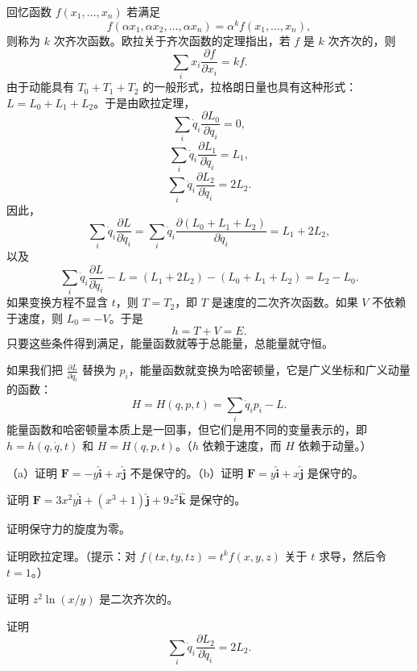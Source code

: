 回忆函数 $f(x_1, \ldots, x_n)$ 若满足
$$
f(\alpha x_1, \alpha x_2, \ldots, \alpha x_n) = \alpha^k f(x_1, \ldots, x_n),
$$
则称为 $k$ 次齐次函数。欧拉关于齐次函数的定理指出，若 $f$ 是 $k$ 次齐次的，则
$$
\sum_i x_i\frac{\partial f}{\partial x_i} = kf.
$$
由于动能具有 $T_0 + T_1 + T_2$ 的一般形式，拉格朗日量也具有这种形式：$L = L_0 + L_1 + L_2$。于是由欧拉定理，
$$
\sum_i\dot{q}_i\frac{\partial L_0}{\partial \dot{q}_i} = 0,
$$
$$
\sum_i\dot{q}_i\frac{\partial L_1}{\partial \dot{q}_i} = L_1,
$$
$$
\sum_i\dot{q}_i\frac{\partial L_2}{\partial \dot{q}_i} = 2L_2.
$$
因此，
$$
\sum_i\dot{q}_i\frac{\partial L}{\partial \dot{q}_i} = \sum_i\dot{q}_i\frac{\partial (L_0 + L_1 + L_2)}{\partial \dot{q}_i} = L_1 + 2L_2,
$$
以及
$$
\sum_i\dot{q}_i\frac{\partial L}{\partial \dot{q}_i} - L = (L_1 + 2L_2) - (L_0 + L_1 + L_2) = L_2 - L_0.
$$
如果变换方程不显含 $t$，则 $T = T_2$，即 $T$ 是速度的二次齐次函数。如果 $V$ 不依赖于速度，则 $L_0 = -V$。于是
$$
h = T + V = E.
$$
只要这些条件得到满足，能量函数就等于总能量，总能量就守恒。

如果我们把 $\frac{\partial L}{\partial \dot{q}_i}$ 替换为 $p_i$，能量函数就变换为哈密顿量，它是广义坐标和广义动量的函数：
$$
H = H(q, p, t) = \sum_i\dot{q}_ip_i - L.
$$
能量函数和哈密顿量本质上是一回事，但它们是用不同的变量表示的，即 $h = h(q, \dot{q}, t)$ 和 $H = H(q, p, t)$。（$h$ 依赖于速度，而 $H$ 依赖于动量。）

\begin{exercise}
（a）证明 $\mathbf{F} = -y\hat{\mathbf{i}} + x\hat{\mathbf{j}}$ 不是保守的。（b）证明 $\mathbf{F} = y\hat{\mathbf{i}} + x\hat{\mathbf{j}}$ 是保守的。
\end{exercise}

\begin{exercise}
证明 $\mathbf{F} = 3x^2y\hat{\mathbf{i}} + (x^3 + 1)\hat{\mathbf{j}} + 9z^2\hat{\mathbf{k}}$ 是保守的。
\end{exercise}

\begin{exercise}
证明保守力的旋度为零。
\end{exercise}

\begin{exercise}
证明欧拉定理。（提示：对 $f(tx, ty, tz) = t^k f(x, y, z)$ 关于 $t$ 求导，然后令 $t = 1$。）
\end{exercise}

\begin{exercise}
证明 $z^2\ln(x/y)$ 是二次齐次的。
\end{exercise}

\begin{exercise}
证明
$$
\sum_i\dot{q}_i\frac{\partial L_2}{\partial \dot{q}_i} = 2L_2.
$$
\end{exercise}

